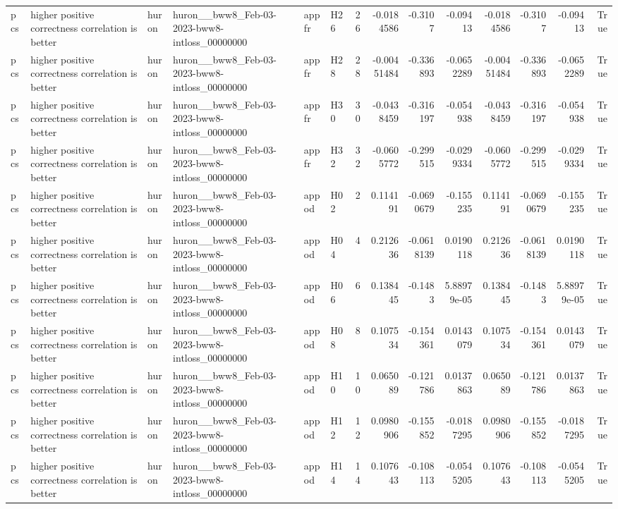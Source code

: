 \begin{longtable}{llllllrrrrrrrr}
pcs & higher positive correctness correlation is better & huron & huron\_\_bww8\_Feb-03-2023-bww8-intloss\_00000000 & appfr & H26 & 26 & -0.0184586 & -0.3107 & -0.09413 & -0.0184586 & -0.3107 & -0.09413 & True \\
pcs & higher positive correctness correlation is better & huron & huron\_\_bww8\_Feb-03-2023-bww8-intloss\_00000000 & appfr & H28 & 28 & -0.00451484 & -0.336893 & -0.0652289 & -0.00451484 & -0.336893 & -0.0652289 & True \\
pcs & higher positive correctness correlation is better & huron & huron\_\_bww8\_Feb-03-2023-bww8-intloss\_00000000 & appfr & H30 & 30 & -0.0438459 & -0.316197 & -0.054938 & -0.0438459 & -0.316197 & -0.054938 & True \\
pcs & higher positive correctness correlation is better & huron & huron\_\_bww8\_Feb-03-2023-bww8-intloss\_00000000 & appfr & H32 & 32 & -0.0605772 & -0.299515 & -0.0299334 & -0.0605772 & -0.299515 & -0.0299334 & True \\
pcs & higher positive correctness correlation is better & huron & huron\_\_bww8\_Feb-03-2023-bww8-intloss\_00000000 & appod & H02 & 2 & 0.114191 & -0.0690679 & -0.155235 & 0.114191 & -0.0690679 & -0.155235 & True \\
pcs & higher positive correctness correlation is better & huron & huron\_\_bww8\_Feb-03-2023-bww8-intloss\_00000000 & appod & H04 & 4 & 0.212636 & -0.0618139 & 0.0190118 & 0.212636 & -0.0618139 & 0.0190118 & True \\
pcs & higher positive correctness correlation is better & huron & huron\_\_bww8\_Feb-03-2023-bww8-intloss\_00000000 & appod & H06 & 6 & 0.138445 & -0.1483 & 5.88979e-05 & 0.138445 & -0.1483 & 5.88979e-05 & True \\
pcs & higher positive correctness correlation is better & huron & huron\_\_bww8\_Feb-03-2023-bww8-intloss\_00000000 & appod & H08 & 8 & 0.107534 & -0.154361 & 0.0143079 & 0.107534 & -0.154361 & 0.0143079 & True \\
pcs & higher positive correctness correlation is better & huron & huron\_\_bww8\_Feb-03-2023-bww8-intloss\_00000000 & appod & H10 & 10 & 0.065089 & -0.121786 & 0.0137863 & 0.065089 & -0.121786 & 0.0137863 & True \\
pcs & higher positive correctness correlation is better & huron & huron\_\_bww8\_Feb-03-2023-bww8-intloss\_00000000 & appod & H12 & 12 & 0.0980906 & -0.155852 & -0.0187295 & 0.0980906 & -0.155852 & -0.0187295 & True \\
pcs & higher positive correctness correlation is better & huron & huron\_\_bww8\_Feb-03-2023-bww8-intloss\_00000000 & appod & H14 & 14 & 0.107643 & -0.108113 & -0.0545205 & 0.107643 & -0.108113 & -0.0545205 & True \\

\end{longtable}

